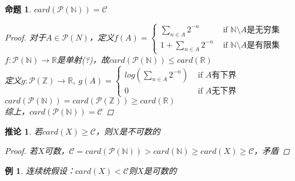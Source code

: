\documentclass[12pt, a4paper, oneside]{ctexbook}
\newtheorem{corollary}[theorem]{推论}
\newtheorem{example}[theorem]{例}
\newtheorem{proposition}[theorem]{命题}
\begin{document}
\begin{proposition}
    $card(\mathcal{P}(\mathbb{N}))=\mathcal{C}$
    \begin{proof}
        对于$A\in\mathcal{P}(N)$，定义$f(A)=\begin{cases}
            \sum_{n\in A}2^{-n}& \text{ if } \mathbb{N}\setminus A\text{是无穷集}  \\
            1+\sum_{n\in A}2^{-n}& \text{ if } \mathbb{N}\setminus A\text{是有限集}
          \end{cases}$\\
        $f:\mathcal{P}(\mathbb{N})\rightarrow \mathbb{R}$是单射(?)，故$card(\mathcal{P}(\mathbb{N}))\leq card(\mathbb{R})$\\
        定义$g:\mathcal{P}(\mathbb{Z})\rightarrow \mathbb{R},\ g(A)=\begin{cases}
            log(\sum_{n\in A}2^{-n})& \text{ if } A\text{有下界} \\
            0& \text{ if } A\text{无下界}
          \end{cases}$\\
        $card(\mathcal{P}(\mathbb{N}))=card(\mathcal{P}(\mathbb{Z}))\geq card(\mathbb{R})$\\
        综上，$card(\mathcal{P}(\mathbb{N}))=\mathcal{C}$
    \end{proof}
\end{proposition}
\begin{corollary}
    若$card(X)\geq\mathcal{C}$，则$X$是不可数的
    \begin{proof}
        若$X$可数，$\mathcal{C}=card(\mathcal{P}(\mathbb{N}))>card(\mathbb{N})\geq card(X)\geq \mathcal{C}$，矛盾
    \end{proof}
\end{corollary}
\begin{example}
    连续统假设：$card(X)<\mathcal{C}$则$X$是可数的
\end{example}
\end{document}
